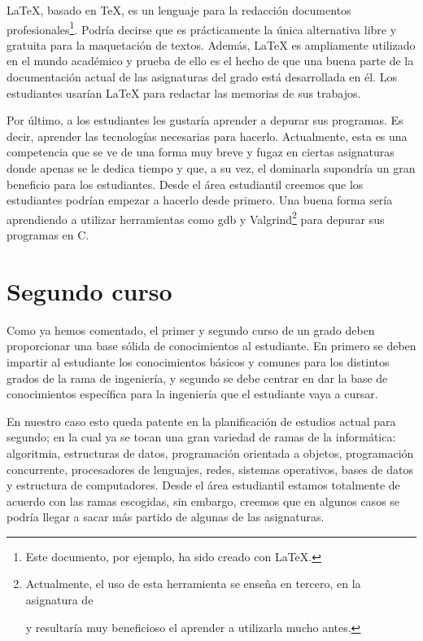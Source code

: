 \LaTeX, basado en \TeX, es un lenguaje para
la redacción documentos profesionales\footnote{
    Este documento, por ejemplo, ha sido creado con \LaTeX.
}.
Podría decirse que es prácticamente la única alternativa
libre y gratuita para la maquetación de textos.
Además, \LaTeX{} es ampliamente utilizado en el mundo académico y prueba de
ello es el hecho de que una buena parte de la documentación actual de las
 asignaturas del grado está desarrollada en él.
Los estudiantes usarían \LaTeX{} para redactar las memorias de sus trabajos.

Por último, a los estudiantes les gustaría aprender a depurar sus programas.
Es decir, aprender las tecnologías necesarias para hacerlo.
Actualmente, esta es una competencia que se ve de una forma muy breve y fugaz
en ciertas asignaturas donde apenas se le dedica tiempo y que, a su vez, el
dominarla supondría un gran beneficio para los estudiantes.
Desde el área estudiantil creemos que los estudiantes podrían empezar a
hacerlo desde primero.
Una buena forma sería
aprendiendo a utilizar herramientas como gdb y Valgrind\footnote{Actualmente,
 el uso de esta herramienta se enseña en tercero, en la asignatura de
 \subject{Ampliación de Sistemas Operativos} y resultaría muy beneficioso el
 aprender a utilizarla mucho antes.} para depurar sus programas en C.

\section{Segundo curso}

Como ya hemos comentado,
el primer y segundo curso de un grado deben proporcionar
una base sólida de conocimientos al estudiante.
En primero se deben impartir al estudiante
los conocimientos básicos y comunes para
los distintos grados de la rama de ingeniería,
y segundo se debe centrar en dar la base de conocimientos específica
para la ingeniería que el estudiante vaya a cursar.

En nuestro caso esto queda patente en
la planificación de estudios actual para segundo;
en la cual ya se tocan una gran variedad de ramas de la informática:
algoritmia, estructuras de datos, programación orientada a objetos,
programación concurrente, procesadores de lenguajes, redes, sistemas operativos,
bases de datos y estructura de computadores.
Desde el área estudiantil estamos totalmente de acuerdo con las ramas escogidas,
sin embargo, creemos que en algunos casos
se podría llegar a sacar más partido de algunas de las asignaturas.

